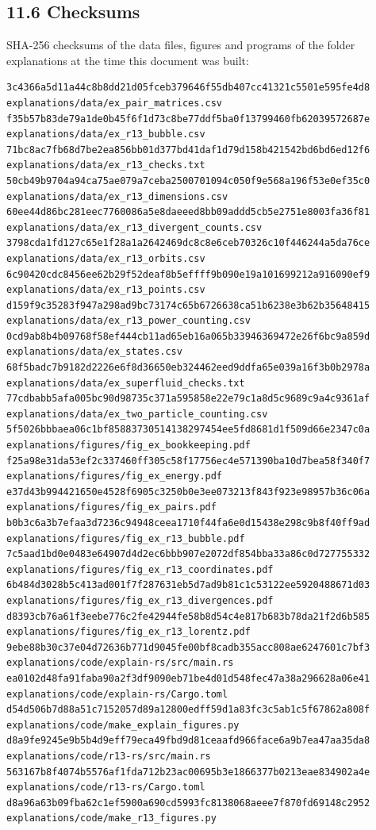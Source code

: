 \documentclass[
  10pt,
]{article}
\begin{document}
\hypertarget{checksums}{%
\subsection{11.6 Checksums}\label{checksums}}

SHA-256 checksums of the data files, figures and programs of the folder
explanations at the time this document was built:

\begin{verbatim}
3c4366a5d11a44c8b8dd21d05fceb379646f55db407cc41321c5501e595fe4d8  explanations/data/ex_pair_matrices.csv
f35b57b83de79a1de0b45f6f1d73c8be77ddf5ba0f13799460fb62039572687e  explanations/data/ex_r13_bubble.csv
71bc8ac7fb68d7be2ea856bb01d377bd41daf1d79d158b421542bd6bd6ed12f6  explanations/data/ex_r13_checks.txt
50cb49b9704a94ca75ae079a7ceba2500701094c050f9e568a196f53e0ef35c0  explanations/data/ex_r13_dimensions.csv
60ee44d86bc281eec7760086a5e8daeeed8bb09addd5cb5e2751e8003fa36f81  explanations/data/ex_r13_divergent_counts.csv
3798cda1fd127c65e1f28a1a2642469dc8c8e6ceb70326c10f446244a5da76ce  explanations/data/ex_r13_orbits.csv
6c90420cdc8456ee62b29f52deaf8b5effff9b090e19a101699212a916090ef9  explanations/data/ex_r13_points.csv
d159f9c35283f947a298ad9bc73174c65b6726638ca51b6238e3b62b35648415  explanations/data/ex_r13_power_counting.csv
0cd9ab8b4b09768f58ef444cb11ad65eb16a065b33946369472e26f6bc9a859d  explanations/data/ex_states.csv
68f5badc7b9182d2226e6f8d36650eb324462eed9ddfa65e039a16f3b0b2978a  explanations/data/ex_superfluid_checks.txt
77cdbabb5afa005bc90d98735c371a595858e22e79c1a8d5c9689c9a4c9361af  explanations/data/ex_two_particle_counting.csv
5f5026bbbaea06c1bf85883730514138297454ee5fd8681d1f509d66e2347c0a  explanations/figures/fig_ex_bookkeeping.pdf
f25a98e31da53ef2c337460ff305c58f17756ec4e571390ba10d7bea58f340f7  explanations/figures/fig_ex_energy.pdf
e37d43b994421650e4528f6905c3250b0e3ee073213f843f923e98957b36c06a  explanations/figures/fig_ex_pairs.pdf
b0b3c6a3b7efaa3d7236c94948ceea1710f44fa6e0d15438e298c9b8f40ff9ad  explanations/figures/fig_ex_r13_bubble.pdf
7c5aad1bd0e0483e64907d4d2ec6bbb907e2072df854bba33a86c0d727755332  explanations/figures/fig_ex_r13_coordinates.pdf
6b484d3028b5c413ad001f7f287631eb5d7ad9b81c1c53122ee5920488671d03  explanations/figures/fig_ex_r13_divergences.pdf
d8393cb76a61f3eebe776c2fe42944fe58b8d54c4e817b683b78da21f2d6b585  explanations/figures/fig_ex_r13_lorentz.pdf
9ebe88b30c37e04d72636b771d9045fe00bf8cadb355acc808ae6247601c7bf3  explanations/code/explain-rs/src/main.rs
ea0102d48fa91faba90a2f3df9090eb71be4d01d548fec47a38a296628a06e41  explanations/code/explain-rs/Cargo.toml
d54d506b7d88a51c7152057d89a12800edff59d1a83fc3c5ab1c5f67862a808f  explanations/code/make_explain_figures.py
d8a9fe9245e9b5b4d9eff79eca49fbd9d81ceaafd966face6a9b7ea47aa35da8  explanations/code/r13-rs/src/main.rs
563167b8f4074b5576af1fda712b23ac00695b3e1866377b0213eae834902a4e  explanations/code/r13-rs/Cargo.toml
d8a96a63b09fba62c1ef5900a690cd5993fc8138068aeee7f870fd69148c2952  explanations/code/make_r13_figures.py
\end{verbatim}
\end{document}
